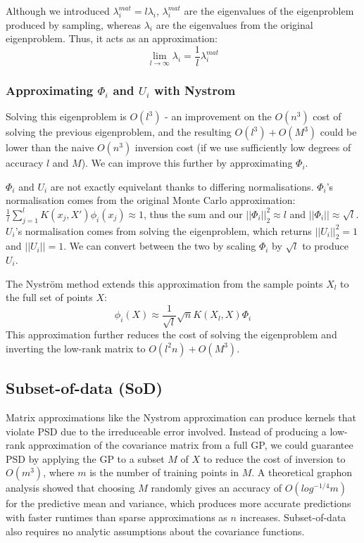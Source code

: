 Although we introduced $\lambda_i^{mat} = l \lambda_i$, $\lambda_i^{mat}$ are the eigenvalues of the eigenproblem produced by sampling, whereas $\lambda_i$ are the eigenvalues from the original eigenproblem. Thus, it acts as an approximation:
\begin{equation*}
    \lim_{l \to \infty} \lambda_i = \frac{1}{l} \lambda_i^{mat} 
\end{equation*}

\subsubsection{Approximating $\Phi_i$ and $U_i$ with Nystrom}
Solving this eigenproblem is $O(l^3)$ - an improvement on the $O(n^3)$ cost of solving the previous eigenproblem, and the resulting $O(l^3) + O(M^3)$ could be lower than the naive $O(n^3)$ inversion cost (if we use sufficiently low degrees of accuracy $l$ and $M$). We can improve this further by approximating $\Phi_i$.

$\Phi_i$ and $U_i$ are not exactly equivelant thanks to differing normalisations. $\Phi_i$'s normalisation comes from the original Monte Carlo approximation: $\frac{1}{l} \sum_{j=1}^{l} K(x_j, X') \phi_i(x_j) \approx 1$, thus the sum and our $||\Phi_i||_2^2 \approx l$ and $||\Phi_i|| \approx \sqrt{l}$. $U_i$'s normalisation comes from solving the eigenproblem, which returns $||U_i||_2^2 = 1$ and $||U_i|| = 1$. We can convert between the two by scaling $\Phi_i$ by $\sqrt{l}$ to produce $U_i$.

The Nyström method \cite{nystrom} extends this approximation from the sample points $X_l$ to the full set of points $X$:
\begin{equation*}
    \phi_i(X) \approx \frac{1}{\sqrt{l}} \sqrt{n} K(X_l, X) \Phi_i
\end{equation*}
This approximation further reduces the cost of solving the eigenproblem and inverting the low-rank matrix to $O(l^2 n) + O(M^3)$.


\subsection{Subset-of-data (SoD) \cite{big-data}}
Matrix approximations like the Nystrom approximation can produce kernels that violate PSD due to the irreduceable error involved. Instead of producing a low-rank approximation of the covariance matrix from a full GP, we could guarantee PSD by applying the GP to a subset $M$ of $X$ to reduce the cost of inversion to $O(m^3)$, where $m$ is the number of training points in $M$. A theoretical graphon analysis showed that choosing $M$ randomly gives an accuracy of $O(log^{-1/4}m)$ for the predictive mean and variance, which produces more accurate predictions with faster runtimes than sparse approximations as $n$ increases. \cite{random-subsampling} Subset-of-data also requires no analytic assumptions about the covariance functions.

